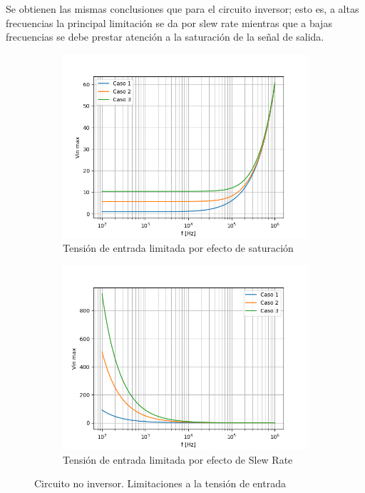 Se obtienen las mismas conclusiones que para el circuito inversor; esto es, a altas frecuencias la principal limitación se da por slew rate mientras que a bajas frecuencias se debe prestar atención a la saturación de la señal de salida. 

\begin{figure}[H]
	\begin{subfigure}{.5\textwidth}
	    \centering
		\includegraphics[width=.8\linewidth]{./Imagenes/SatNoInv.png}  
		\caption{Tensión de entrada limitada por efecto de saturación}
	\end{subfigure}
	\begin{subfigure}{.5\textwidth}
	    \centering
		\includegraphics[width=.8\linewidth]{./Imagenes/SRNoInv.png}  
		\caption{Tensión de entrada limitada por efecto de Slew Rate}
	\end{subfigure}
	\caption{Circuito no inversor. Limitaciones a la tensión de entrada}
	\label{fig:invcasos}
\end{figure} 



